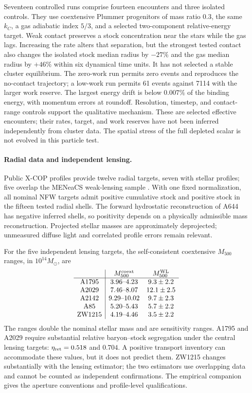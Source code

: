 Seventeen controlled runs comprise fourteen encounters and three isolated
controls. They use coextensive Plummer progenitors of mass ratio $0.3$,
the same $k_C$, a gas adiabatic index $5/3$, and a selected two-component
relative-energy target. Weak contact preserves a stock concentration near
the stars while the gas lags. Increasing the rate alters that separation,
but the strongest tested contact also changes the isolated stock median
radius by $-27\%$ and the gas median radius by $+46\%$ within six dynamical
time units. It has not selected a stable cluster equilibrium.
The zero-work run permits zero events and reproduces the no-contact
trajectory; a low-work run permits 61 events against 7114 with the larger
work reserve. The largest energy drift is below $0.007\%$ of the binding
energy, with momentum errors at roundoff. Resolution, timestep, and
contact-range controls support the qualitative mechanism. These are
selected effective encounters; their rates, target, and work reserves
have not been inferred independently from cluster data. The spatial
stress of the full depleted scalar is not evolved in this particle test.

\paragraph{Radial data and independent lensing.}
Public X-COP profiles provide twelve radial targets, seven with stellar
profiles; five overlap the MENeaCS weak-lensing sample
\citep{Ettori2019Cluster,Herbonnet2020Cluster}. With one fixed normalization,
all nominal NFW targets admit positive cumulative stock and positive
stock in the fifteen tested radial shells. The forward hydrostatic
reconstruction of A644 has negative inferred shells, so positivity depends
on a physically admissible mass reconstruction. Projected stellar masses
are approximately deprojected; unmeasured diffuse light and correlated
profile errors remain relevant.

For the five independent lensing targets, the self-consistent coextensive
$M_{500}$ ranges, in $10^{14}M_\odot$, are
\[
\begin{array}{c|cc}
 &M_{500}^{\rm coext}&M_{500}^{\rm WL}\\\hline
\mathrm{A1795}&3.96\text{--}4.23&9.3\pm2.2\\
\mathrm{A2029}&7.46\text{--}8.07&12.1\pm2.5\\
\mathrm{A2142}&9.29\text{--}10.02&9.7\pm2.3\\
\mathrm{A85}&5.20\text{--}5.43&5.7\pm2.2\\
\mathrm{ZW1215}&4.19\text{--}4.46&3.5\pm2.2
\end{array}
\]
The ranges double the nominal stellar mass and are sensitivity ranges.
A1795 and A2029 require substantial relative baryon--stock segregation
under the central lensing targets: $\eta_{\rm ret}=0.518$ and $0.704$.
A positive transport inventory can accommodate these values, but it does
not predict them. ZW1215 changes substantially with the lensing estimator;
the two estimators use overlapping data and cannot be counted as independent
confirmations. The empirical companion gives the aperture conventions
and profile-level qualifications.

